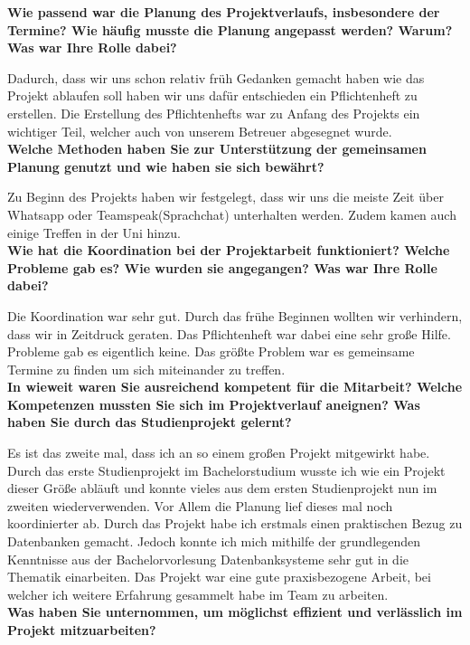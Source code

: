 \textbf{Wie passend war die Planung des Projektverlaufs, insbesondere der Termine? Wie
häufig musste die Planung angepasst werden? Warum? Was war Ihre Rolle dabei?}

Dadurch, dass wir uns schon relativ früh Gedanken gemacht haben wie das Projekt ablaufen soll haben wir uns dafür entschieden ein Pflichtenheft zu erstellen. Die Erstellung des Pflichtenhefts war zu Anfang des Projekts ein wichtiger Teil, welcher auch von unserem Betreuer abgesegnet wurde.
\\

\textbf{Welche Methoden haben Sie zur Unterstützung der gemeinsamen Planung genutzt
und wie haben sie sich bewährt?}

Zu Beginn des Projekts haben wir festgelegt, dass wir uns die meiste Zeit über Whatsapp oder Teamspeak(Sprachchat) unterhalten werden. Zudem kamen auch einige Treffen in der Uni hinzu.
\\

\textbf{Wie hat die Koordination bei der Projektarbeit funktioniert? Welche Probleme gab
es? Wie wurden sie angegangen? Was war Ihre Rolle dabei?}

Die Koordination war sehr gut. Durch das frühe Beginnen wollten wir verhindern, dass wir in Zeitdruck geraten. Das Pflichtenheft war dabei eine sehr große Hilfe. Probleme gab es eigentlich keine. Das größte Problem war es gemeinsame Termine zu finden um sich miteinander zu treffen.
\\

\textbf{In wieweit waren Sie ausreichend kompetent für die Mitarbeit? Welche Kompetenzen mussten Sie sich im Projektverlauf aneignen? Was haben Sie durch das Studienprojekt gelernt?}

Es ist das zweite mal, dass ich an so einem großen Projekt mitgewirkt habe. Durch das erste Studienprojekt im Bachelorstudium wusste ich wie ein Projekt dieser Größe abläuft und konnte vieles aus dem ersten Studienprojekt nun im zweiten wiederverwenden. Vor Allem die Planung lief dieses mal noch koordinierter ab.
Durch das Projekt habe ich erstmals einen praktischen Bezug zu Datenbanken gemacht. Jedoch konnte ich mich mithilfe der grundlegenden Kenntnisse aus der Bachelorvorlesung Datenbanksysteme sehr gut in die Thematik einarbeiten. 
Das Projekt war eine gute praxisbezogene Arbeit, bei welcher ich weitere Erfahrung gesammelt habe im Team zu arbeiten.
\\

\textbf {Was haben Sie unternommen, um möglichst effizient und verlässlich im Projekt mitzuarbeiten?}

